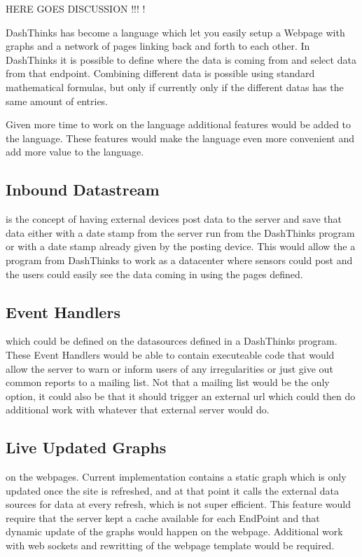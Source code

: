 HERE GOES DISCUSSION !!! !

DashThinks has become a language which let you easily setup a Webpage with graphs and a network
of pages linking back and forth to each other.
In DashThinks it is possible to define where the data is coming from and select data from that
endpoint. Combining different data is possible using standard mathematical formulas,
but only if currently only if the different datas has the same amount of entries.

Given more time to work on the language additional features would be added to the language.
These features would make the language even more convenient and add more value to the language.

\subsection{Inbound Datastream} is the concept of having external devices post data to the
server and save that data either with a date stamp from the server run from the DashThinks
program or with a date stamp already given by the posting device. This would allow the a program
from DashThinks to work as a datacenter where sensors could post and the users could easily see
the data coming in using the pages defined.

\subsection{Event Handlers} which could be defined on the datasources defined in a DashThinks
program. These Event Handlers would be able to contain executeable code that would allow the
server to warn or inform users of any irregularities or just give out common reports to
a mailing list. Not that a mailing list would be the only option, it could also be that it
should trigger an external url which could then do additional work with whatever that external
server would do.

\subsection{Live Updated Graphs} on the webpages. Current implementation contains a static
graph which is only updated once the site is refreshed, and at that point it calls the
external data sources for data at every refresh, which is not super efficient. This feature
would require that the server kept a cache available for each EndPoint and that dynamic
update of the graphs would happen on the webpage. Additional work with web sockets and
rewritting of the webpage template would be required.


